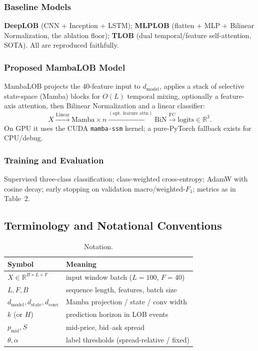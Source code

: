 \documentclass[11pt]{article}
\begin{document}
\subsubsection{Baseline Models}
\textbf{DeepLOB} (CNN + Inception + LSTM); \textbf{MLPLOB} (flatten + MLP + Bilinear Normalization, the
ablation floor); \textbf{TLOB} (dual temporal/feature self-attention, SOTA). All are reproduced faithfully.

\subsubsection{Proposed MambaLOB Model}
MambaLOB projects the 40-feature input to $d_{\mathrm{model}}$, applies a stack of selective state-space
(Mamba) blocks for $O(L)$ temporal mixing, optionally a feature-axis attention, then Bilinear Normalization
and a linear classifier:
\[
X \xrightarrow{\text{Linear}} \text{Mamba}\times n \xrightarrow{(\text{opt.\ feature attn})}
\text{BiN} \xrightarrow{\text{FC}} \text{logits}\in\mathbb{R}^{3}.
\]
On GPU it uses the CUDA \texttt{mamba-ssm} kernel; a pure-PyTorch fallback exists for CPU/debug.

\subsubsection{Training and Evaluation}
Supervised three-class classification; class-weighted cross-entropy; AdamW with cosine decay; early
stopping on validation macro/weighted-$F_1$; metrics as in Table~2.

\subsection{Terminology and Notational Conventions}
\begin{table}[h]
\centering
\caption{Notation.}
\begin{tabular}{@{}ll@{}}
\toprule
Symbol & Meaning \\
\midrule
$X \in \mathbb{R}^{B\times L\times F}$ & input window batch ($L=100$, $F=40$) \\
$L, F, B$ & sequence length, features, batch size \\
$d_{\mathrm{model}}, d_{\mathrm{state}}, d_{\mathrm{conv}}$ & Mamba projection / state / conv width \\
$k$ (or $H$) & prediction horizon in LOB events \\
$p_{\mathrm{mid}}, S$ & mid-price, bid--ask spread \\
$\theta, \alpha$ & label thresholds (spread-relative / fixed) \\
\bottomrule
\end{tabular}
\end{table}
\end{document}
